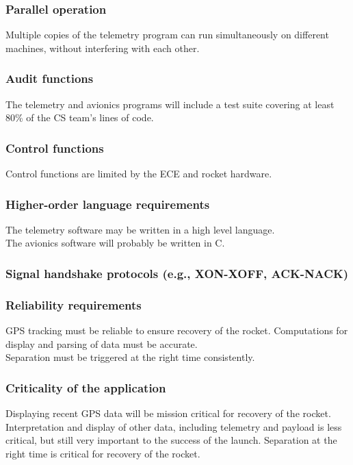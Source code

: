 \documentclass[onecolumn, draftclsnofoot, 10pt, compsoc]{IEEEtran}
\begin{document}
\subsubsection{Parallel operation}
Multiple copies of the telemetry program can run simultaneously on different machines, without interfering with each other.

\subsubsection{Audit functions}
The telemetry and avionics programs will include a test suite covering at least 80\% of the CS team’s lines of code.

\subsubsection{Control functions}
Control functions are limited by the ECE and rocket hardware.

\subsubsection{Higher-order language requirements}
The telemetry software may be written in a high level language.\\
The avionics software will probably be written in C.

\subsubsection{Signal handshake protocols (e.g., XON-XOFF, ACK-NACK)}

\subsubsection{Reliability requirements}
GPS tracking must be reliable to ensure recovery of the rocket. Computations for display and parsing of data must be accurate.\\
Separation must be triggered at the right time consistently.

\subsubsection{Criticality of the application}
Displaying recent GPS data will be mission critical for recovery of the rocket. Interpretation and display of other data, including telemetry and payload is less critical, but still very important to the success of the launch. Separation at the right time is critical for recovery of the rocket.
\end{document}
